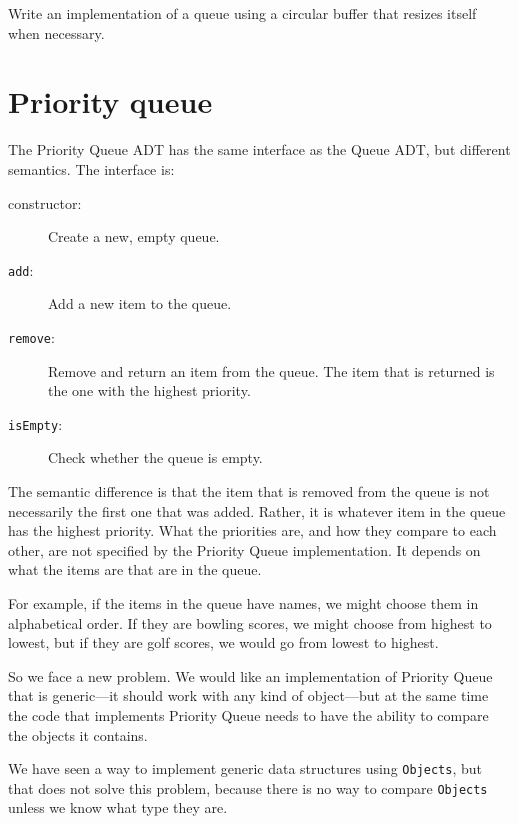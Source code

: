 \begin{exercise}
Write an implementation of a queue using a circular buffer that
resizes itself when necessary.
\end{exercise}


\section{Priority queue}

The Priority Queue ADT has the same interface as
the Queue ADT, but different semantics.  The interface is:

\begin{description}

\item[constructor:] Create a new, empty queue.

\item[{\tt add}:] Add a new item to the queue.

\item[{\tt remove}:] Remove and return an item from the queue.  The item
that is returned is the one with the highest priority.

\item[{\tt isEmpty}:] Check whether the queue is empty.

\end{description}

The semantic difference is that the item that is removed from
the queue is not necessarily the first one that was added.  Rather,
it is whatever item in the queue has the highest priority.
What the priorities are, and how they compare to each other, are not
specified by the Priority Queue implementation.  It depends on
what the items are that are in the queue.

For example, if the items in the queue have names, we might choose
them in alphabetical order.  If they are bowling scores, we might
choose from highest to lowest, but if they are golf scores, we would
go from lowest to highest.


So we face a new problem.  We would like an implementation of
Priority Queue that is generic---it should work with any kind
of object---but at the same time the code that implements Priority
Queue needs to have the ability to compare the objects it contains.

We have seen a way to implement generic data structures using
{\tt Objects}, but that does not solve this problem, because
there is no way to compare {\tt Objects} unless we know what type
they are.


